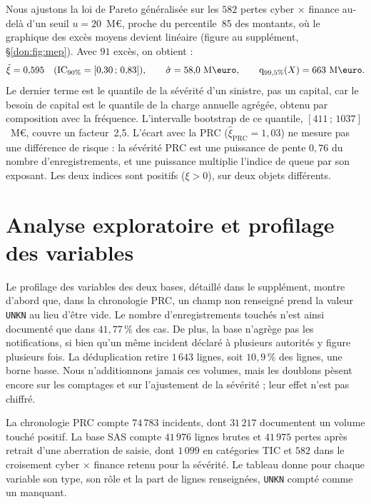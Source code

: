 Nous ajustons la loi de Pareto généralisée sur les $582$ pertes cyber $\times$ finance au-delà d'un
seuil $u = 20$~M\euro, proche du percentile~85 des montants, où le graphique des excès moyens devient
linéaire (figure au supplément, \S\ref{don:fig:mep}). Avec $91$ excès, on obtient :
\[
\hat{\xi} = 0{,}595 \quad (\text{IC}_{90\%}=[0{,}30\,;\,0{,}83]), \qquad
\hat{\sigma} = 58{,}0~\text{M\euro}, \qquad
\qsev_{99{,}5\%}(X) = 663~\text{M\euro}.
\]
Le dernier terme est le quantile de la sévérité d'un sinistre, pas un capital, car le besoin de capital
est le quantile de la charge annuelle agrégée, obtenu par composition avec la fréquence. L'intervalle
bootstrap de ce quantile, $[411\,;\,1037]$~M\euro, couvre un facteur~2{,}5. L'écart avec la PRC
($\hat{\xi}_{\text{PRC}} = 1{,}03$) ne mesure pas une différence de risque : la sévérité PRC
est une puissance de pente $0{,}76$ du nombre d'enregistrements, et une puissance multiplie l'indice
de queue par son exposant. Les deux indices sont positifs ($\xi > 0$), sur deux objets différents.

\section{Analyse exploratoire et profilage des variables}
\label{sec:profilage-variables}

Le profilage des variables des deux bases, détaillé dans le supplément, montre d'abord que, dans la
chronologie PRC, un champ non renseigné prend la valeur \texttt{UNKN} au lieu d'être vide. Le nombre d'enregistrements touchés n'est ainsi documenté que dans $41{,}77\,\%$ des cas. De plus, la base n'agrège pas les
notifications, si bien qu'un même incident déclaré à plusieurs autorités y figure plusieurs fois. La
déduplication retire $1\,643$ lignes, soit $10{,}9\,\%$ des lignes, une borne basse. Nous n'additionnons jamais ces volumes, mais les doublons pèsent encore sur les comptages et sur l'ajustement de la sévérité ; leur effet n'est pas chiffré.

La chronologie PRC compte $74\,783$ incidents, dont $31\,217$ documentent un volume touché
positif. La base SAS compte $41\,976$ lignes brutes et $41\,975$ pertes après retrait d'une
aberration de saisie, dont $1\,099$ en catégories TIC et $582$ dans le croisement cyber $\times$
finance retenu pour la sévérité. Le tableau donne pour chaque variable son type, son rôle et la part
de lignes renseignées, \texttt{UNKN} compté comme un manquant.


